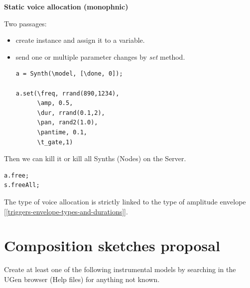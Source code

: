 \textbf{Static voice allocation (monophnic)}

Two passages: 

\begin{itemize}
\tightlist\item create instance and assign it to a variable.
\item send one or multiple parameter changes by \textit{set} method.

\begin{lstlisting}[frame=single, caption=Static voice allocation] 
a = Synth(\model, [\done, 0]);

a.set(\freq, rrand(890,1234), 
      \amp, 0.5, 
      \dur, rrand(0.1,2), 
      \pan, rand2(1.0), 
      \pantime, 0.1, 
      \t_gate,1)
\end{lstlisting}
\end{itemize}

Then we can kill it or kill all Synths (Nodes) on the Server.

\begin{lstlisting}[frame=single] 
a.free;
s.freeAll;
\end{lstlisting}

The type of voice allocation is strictly linked to the type of amplitude envelope [\ref{triggers-envelope-types-and-durations}].

\section{Composition sketches proposal}\label{composition-sketches-proposal}

Create at least one of the following instrumental models by searching in the UGen browser (Help files) for anything not known.

